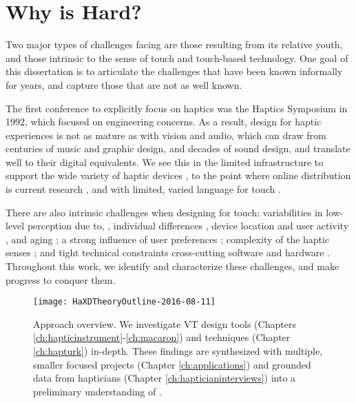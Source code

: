 \section{Why is \haxd Hard?}
Two major types of challenges facing \haxd are those resulting from its relative youth, and those intrinsic to the sense of touch and touch-based technology.
One goal of this dissertation is to articulate the challenges that have been known informally for years, and capture those that are not as well known.

The first conference to explicitly focus on haptics was the Haptics Symposium in 1992, which focused on engineering concerns.
As a result, design for haptic experiences is not as mature as with vision and audio, which can draw from centuries of music and graphic design, and decades of sound design, and translate well to their digital equivalents.
We see this in the limited infrastructure to support the wide variety of haptic devices \cite{Hayward2007}, to the point where online distribution is current research \cite{AbdurRahman2010}, and with limited, varied language for touch \cite{Jansson-Boyd2011}.

There are also intrinsic challenges when designing for touch:
variabilities in low-level perception due to, \eg, individual differences \cite{Lo1984}, device location and user activity \cite{Karuei2011}, and aging \cite{Stevens1996,Stevens1992};
a strong influence of user preferences \cite{Seifi2014,Seifi2015};
complexity of the haptic senses \cite{ChoiKuchenbecker2013,Lederman2009survey,Kandel2000};
and tight technical constraints cross-cutting software and hardware \cite{levitin2000perception,Hayward2007}.
Throughout this work, we identify and characterize these challenges, and make progress to conquer them.




\begin{figure}[htbp]
\begin{center}
\texttt{[image: HaXDTheoryOutline-2016-08-11]}
\caption{Approach overview. We investigate VT design tools (Chapters \ref{ch:hapticinstrument}-\ref{ch:macaron}) and techniques (Chapter \ref{ch:hapturk}) in-depth. These findings are synthesized with multiple, smaller focused projects (Chapter \ref{ch:applications}) and grounded data from hapticians (Chapter \ref{ch:hapticianinterviews}) into a preliminary understanding of \haxd.}
\label{fig:intro:methodologyoverview}
\end{center}
\end{figure}




